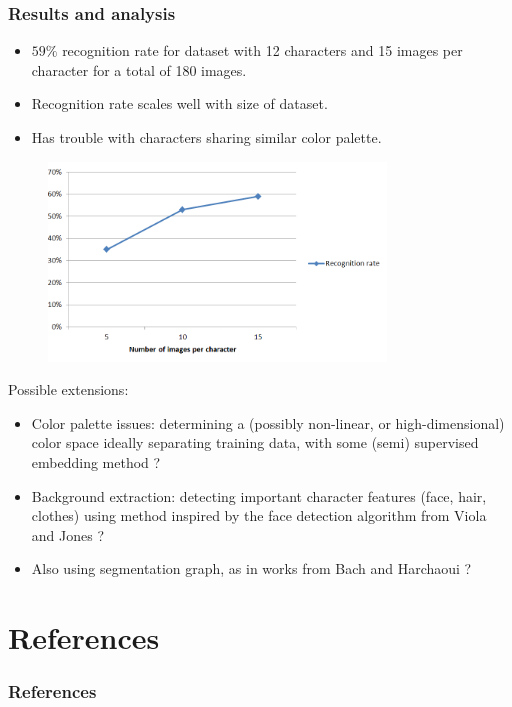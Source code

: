 \documentclass{beamer}
\begin{document}
\begin{frame}
\frametitle{Results and analysis}
\begin{itemize}
\item $59\%$ recognition rate for dataset with 12 characters and 15 images per character for a total of 180 images.
\item Recognition rate scales well with size of dataset.
\item Has trouble with characters sharing similar color palette.
\end{itemize}

\begin{figure}[htb!]
\includegraphics[width=0.8\textwidth]{../images/recognitionRate.png}
\end{figure}

\end{frame}

\begin{frame}
Possible extensions:

\begin{itemize}
\item Color palette issues: determining a (possibly non-linear, or high-dimensional) color space ideally separating training data, with some (semi) supervised embedding method  \cite{urahama2007semi} ?
\item Background extraction: detecting important character features (face, hair, clothes) using method inspired by the face detection algorithm from Viola and Jones \cite{viola2004robust} ?
\item Also using segmentation graph, as in works from Bach and Harchaoui \cite{harchaoui2007image} ?
\end{itemize}
\end{frame}

\section{References}
\begin{frame}
\frametitle{References}
\begin{small}
\printbibliography
\end{small}
\end{frame}
\end{document}

